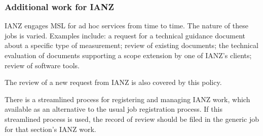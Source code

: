 \subsubsection{Additional work for IANZ}
IANZ engages MSL for ad hoc services from time to time. The nature of these jobs is varied. Examples include: a request for a technical guidance document about a specific type of measurement; review of existing documents; the technical evaluation of documents supporting a scope extension by one of IANZ’s clients; review of software tools. 

The review of a new request from IANZ is also covered by this policy.

There is a streamlined process for registering and managing IANZ work, which available as an alternative to the usual job registration process. If this streamlined process is used, the record of review should be filed in the generic job for that section’s IANZ work.